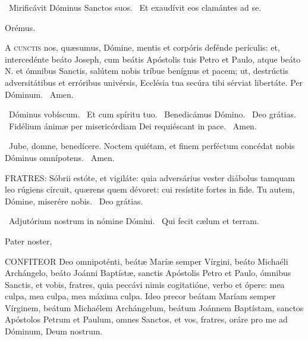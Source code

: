 \V\ Mirificávit Dóminus Sanctos suos. \R\ Et exaudívit eos clamántes ad se.

Orémus. 

\lettrine[lines=2]{A}{} \textsc{cunctis} nos, quæsumus, Dómine, mentis et corpóris defénde perículis: et, intercedénte beáto Joseph, cum beátis Apóstolis tuis Petro et Paulo, atque beáto N. et ómnibus Sanctis, salútem nobis tríbue benígnus et pacem; ut, destrúctis adversitátibus et erróribus univérsis, Ecclésia tua secúra tibi sérviat libertáte. Per Dóminum. \R\ Amen.


\V\ Dóminus vobíscum. \R\ Et cum spíritu tuo. \V\ Benedicámus Dómino. \R\ Deo grátias. \V\ Fidélium ánimæ per misericórdiam Dei requiéscant in pace. \R\ Amen.


\sectionornament



\V\ Jube, domne, benedícere.  Noctem quiétam, et finem perféctum concédat nobis Dóminus omnípotens. \R\ Amen.


\lettrine[lines=2]{F}{RATRES}: Sóbrii estóte, et vigiláte: quia adversárius vester diábolus tamquam leo rúgiens círcuit, quærens quem dévoret: cui resístite fortes in fide. Tu autem, Dómine, miserére nobis. \R\ Deo grátias.

\V\ Adjutórium nostrum in nómine Dómini. \R\ Qui fecit cælum et terram.

Pater noster, 


\lettrine[lines=2]{C}{ONFITEOR} Deo omnipoténti, beátæ Maríæ semper Vírgini, beáto Michaéli Archángelo, beáto Joánni Baptístæ, sanctis Apóstolis Petro et Paulo, ómnibus Sanctis, et vobis, fratres, quia peccávi nimis cogitatióne, verbo et ópere: mea culpa, mea culpa, mea máxima culpa. Ideo precor beátam Maríam semper Vírginem, beátum Michaélem Archángelum, beátum Joánnem Baptístam, sanctos Apóstolos Petrum et Paulum, omnes Sanctos, et vos, fratres, oráre pro me ad Dóminum, Deum nostrum.

